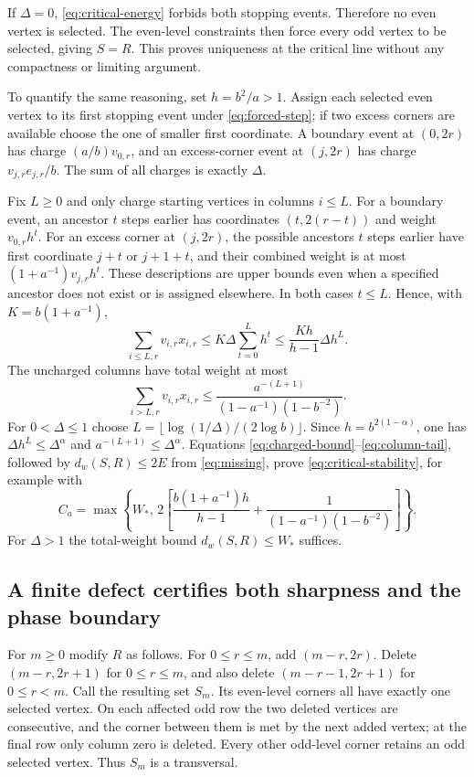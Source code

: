 \documentclass[11pt,a4paper]{article}
\theoremstyle{definition}
\theoremstyle{remark}\newtheorem{remark}[theorem]{Remark}
\begin{document}
If $\Delta=0$, \eqref{eq:critical-energy} forbids both stopping events.
Therefore no even vertex is selected. The even-level constraints then
force every odd vertex to be selected, giving $S=R$. This proves
uniqueness at the critical line without any compactness or limiting
argument.

To quantify the same reasoning, set $h=b^2/a>1$. Assign each selected
even vertex to its first stopping event under \eqref{eq:forced-step};
if two excess corners are available choose the one of smaller first
coordinate. A boundary event at $(0,2r)$ has charge
$(a/b)v_{0,r}$, and an excess-corner event at $(j,2r)$ has charge
$v_{j,r}e_{j,r}/b$. The sum of all charges is exactly $\Delta$.

Fix $L\ge0$ and only charge starting vertices in columns $i\le L$.
For a boundary event, an ancestor $t$ steps earlier has coordinates
$(t,2(r-t))$ and weight $v_{0,r}h^t$. For an excess corner at $(j,2r)$,
the possible ancestors $t$ steps earlier have first coordinate $j+t$
or $j+1+t$, and their combined weight is at most
$(1+a^{-1})v_{j,r}h^t$. These descriptions are upper bounds even
when a specified ancestor does not exist or is assigned elsewhere.
In both cases $t\le L$. Hence, with $K=b(1+a^{-1})$,
\begin{equation}\label{eq:charged-bound}
 \sum_{i\le L,r}v_{i,r}x_{i,r}
 \le K\Delta\sum_{t=0}^L h^t
 \le \frac{Kh}{h-1}\Delta h^L.
\end{equation}
The uncharged columns have total weight at most
\begin{equation}\label{eq:column-tail}
 \sum_{i>L,r}v_{i,r}x_{i,r}
 \le\frac{a^{-(L+1)}}{(1-a^{-1})(1-b^{-2})}.
\end{equation}
For $0<\Delta\le1$ choose
$L=\lfloor\log(1/\Delta)/(2\log b)\rfloor$. Since
$h=b^{2(1-\alpha)}$, one has $\Delta h^L\le\Delta^\alpha$ and
$a^{-(L+1)}\le\Delta^\alpha$. Equations
\eqref{eq:charged-bound}--\eqref{eq:column-tail}, followed by
$d_w(S,R)\le2E$ from \eqref{eq:missing}, prove
\eqref{eq:critical-stability}, for example with
\[
 C_a=\max\left\{W_*,\,
 2\left[\frac{b(1+a^{-1})h}{h-1}
       +\frac1{(1-a^{-1})(1-b^{-2})}\right]\right\}.
\]
For $\Delta>1$ the total-weight bound $d_w(S,R)\le W_*$ suffices.

\subsection{A finite defect certifies both sharpness and the phase boundary}

For $m\ge0$ modify $R$ as follows. For $0\le r\le m$, add
$(m-r,2r)$. Delete $(m-r,2r+1)$ for $0\le r\le m$, and also delete
$(m-r-1,2r+1)$ for $0\le r<m$. Call the resulting set $S_m$.
Its even-level corners all have exactly one selected vertex.
On each affected odd row the two deleted vertices are consecutive,
and the corner between them is met by the next added vertex; at the
final row only column zero is deleted. Every other odd-level corner
retains an odd selected vertex. Thus $S_m$ is a transversal.
\end{document}
